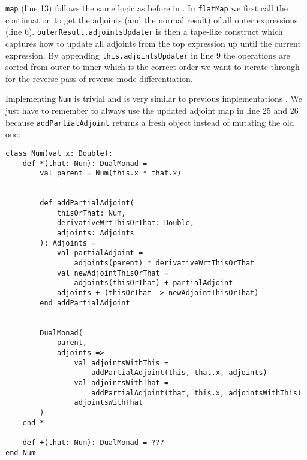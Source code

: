 \lstinline{map} (line 13) follows the same logic as before in . In \lstinline{flatMap} we first call the continuation to get the adjoints (and the normal result) of all outer expressions (line 6). \lstinline{outerResult.adjointsUpdater} is then a tape-like construct which captures how to update all adjoints from the top expression up until the current expression. By appending \lstinline{this.adjointsUpdater} in line 9 the operations are sorted from outer to inner which is the correct order we want to iterate through for the reverse pass of reverse mode differentiation.

Implementing \lstinline{Num} is trivial and is very similar to previous implementations . We just have to remember to always use the updated adjoint map in line 25 and 26 because \lstinline{addPartialAdjoint} returns a fresh object instead of mutating the old one:
\begin{lstlisting}
class Num(val x: Double):
    def *(that: Num): DualMonad =
        val parent = Num(this.x * that.x)


        def addPartialAdjoint(
            thisOrThat: Num, 
            derivativeWrtThisOrThat: Double, 
            adjoints: Adjoints
        ): Adjoints =
            val partialAdjoint = 
                adjoints(parent) * derivativeWrtThisOrThat
            val newAdjointThisOrThat = 
                adjoints(thisOrThat) + partialAdjoint
            adjoints + (thisOrThat -> newAdjointThisOrThat)
        end addPartialAdjoint


        DualMonad(
            parent,
            adjoints =>
                val adjointsWithThis = 
                    addPartialAdjoint(this, that.x, adjoints)
                val adjointsWithThat = 
                    addPartialAdjoint(that, this.x, adjointsWithThis)
                adjointsWithThat
        )
    end *

    def +(that: Num): DualMonad = ???
end Num
\end{lstlisting}

